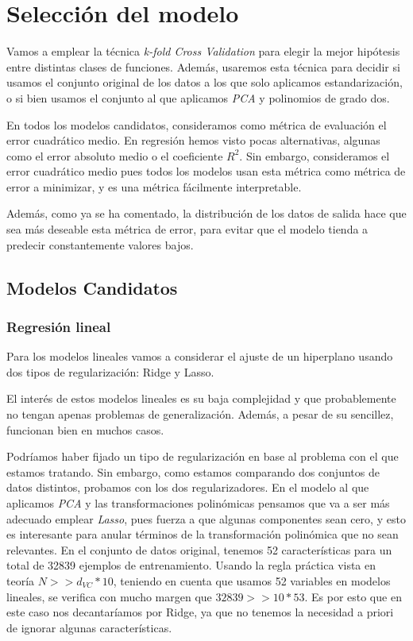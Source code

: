 \documentclass[11pt]{article}
\begin{document}
\pagebreak

\section{Selección del modelo} \label{seleccion_modelos} \label{metrica_error}

Vamos a emplear la técnica \emph{k-fold Cross Validation} para elegir la mejor hipótesis entre distintas clases de funciones. Además, usaremos esta técnica para decidir si usamos el conjunto original de los datos a los que solo aplicamos estandarización, o si bien usamos el conjunto al que aplicamos \emph{PCA} y polinomios de grado dos.

En todos los modelos candidatos, consideramos como métrica de evaluación el error cuadrático medio. En regresión hemos visto pocas alternativas, algunas como el error absoluto medio o el coeficiente $R^2$. Sin embargo, consideramos el error cuadrático medio pues todos los modelos usan esta métrica como métrica de error a minimizar, y es una métrica fácilmente interpretable.

Además, como ya se ha comentado, la distribución de los datos de salida hace que sea más deseable esta métrica de error, para evitar que el modelo tienda a predecir constantemente valores bajos.

\subsection{Modelos Candidatos}

\subsubsection{Regresión lineal} \label{regresion_lineal}

Para los modelos lineales vamos a considerar el ajuste de un hiperplano usando dos tipos de regularización: Ridge y Lasso.

El interés de estos modelos lineales es su baja complejidad y que probablemente no tengan apenas problemas de generalización. Además, a pesar de su sencillez, funcionan bien en muchos casos.

Podríamos haber fijado un tipo de regularización en base al problema con el que estamos tratando. Sin embargo, como estamos comparando dos conjuntos de datos distintos, probamos con los dos regularizadores. En el modelo al que aplicamos \emph{PCA} y las transformaciones polinómicas pensamos que va a ser más adecuado emplear \emph{Lasso}, pues fuerza a que algunas componentes sean cero, y esto es interesante para anular términos de la transformación polinómica que no sean relevantes. En el conjunto de datos original, tenemos 52 características para un total de 32839 ejemplos de entrenamiento. Usando la regla práctica vista en teoría $N >> d_{VC} * 10$, teniendo en cuenta que usamos 52 variables en modelos lineales, se verifica con mucho margen que $32839 >> 10 * 53$. Es por esto que en este caso nos decantaríamos por Ridge, ya que no tenemos la necesidad a priori de ignorar algunas características.
\end{document}

